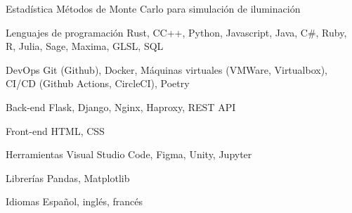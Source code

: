 

\begin{cvskills}

  \cvskill
    {Estadística}
    {Métodos de Monte Carlo para simulación de iluminación}

  \cvskill
    {Lenguajes de programación} %
    {Rust, C\/C++, Python, Javascript, Java, C\#, Ruby, R, Julia, Sage, Maxima, GLSL, SQL} %

  \cvskill
    {DevOps} %
    {Git (Github), Docker, Máquinas virtuales (VMWare, Virtualbox), CI/CD (Github Actions, CircleCI), Poetry} %

  \cvskill
    {Back-end} %
    {Flask, Django, Nginx, Haproxy, REST API} %

  \cvskill
    {Front-end} %
    {HTML, CSS} %

  \cvskill
    {Herramientas}
    {Visual Studio Code, Figma, Unity, Jupyter}

  \cvskill
    {Librerías} %
    {Pandas, Matplotlib} %

  \cvskill
    {Idiomas} %
    {Español, inglés, francés} %

\end{cvskills}
